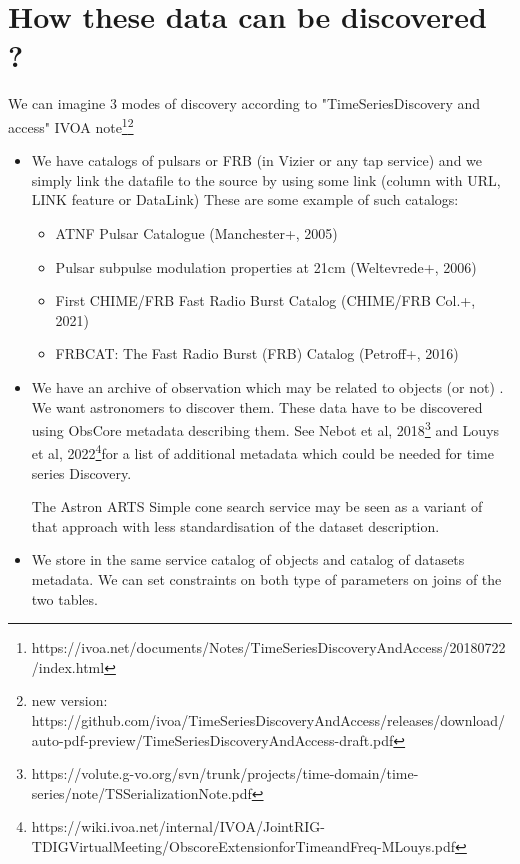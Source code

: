 \documentclass[11pt,a4paper]{ivoa}
\begin{document}
\section{How these data can be discovered ?}

 We can imagine 3 modes of discovery according to "TimeSeriesDiscovery and access" IVOA note\footnote{https://ivoa.net/documents/Notes/TimeSeriesDiscoveryAndAccess/20180722/index.html}\footnote{new version: https://github.com/ivoa/TimeSeriesDiscoveryAndAccess/releases/download/auto-pdf-preview/TimeSeriesDiscoveryAndAccess-draft.pdf}
 \begin{itemize}

  \item{}
  
     We have catalogs of pulsars or FRB (in Vizier or any tap service) and we simply link the datafile to the source by using some link (column with URL, LINK feature or DataLink)
             These are some example of such catalogs:
             \begin{itemize}
              \item ATNF Pulsar Catalogue (Manchester+, 2005) 
              \item Pulsar subpulse modulation properties at 21cm (Weltevrede+, 2006)
              \item First CHIME/FRB Fast Radio Burst Catalog (CHIME/FRB Col.+, 2021)
              \item FRBCAT: The Fast Radio Burst (FRB) Catalog (Petroff+, 2016) 
             \end{itemize}
             
     


     
  

          


    \item{}

         We have an archive of observation which may be related to objects (or not) . We want astronomers to discover them. These data have to be discovered using 
       ObsCore metadata \citep{2017ivoa.spec.0509L} describing them. See Nebot et al, 2018\footnote{https://volute.g-vo.org/svn/trunk/projects/time-domain/time-
series/note/TSSerializationNote.pdf} and Louys et al, 2022\footnote{https://wiki.ivoa.net/internal/IVOA/JointRIG-TDIGVirtualMeeting/ObscoreExtensionforTimeandFreq-MLouys.pdf}for a  list of additional metadata which could be needed for time series Discovery.   

         The Astron ARTS Simple cone search service may be seen as a variant of that approach with less standardisation of the dataset description.   


      \item{}  We store in the same service catalog of objects and catalog of datasets metadata. We can set constraints on both type of parameters on joins of the two tables.
             
           
\end{itemize} 
\end{document}
